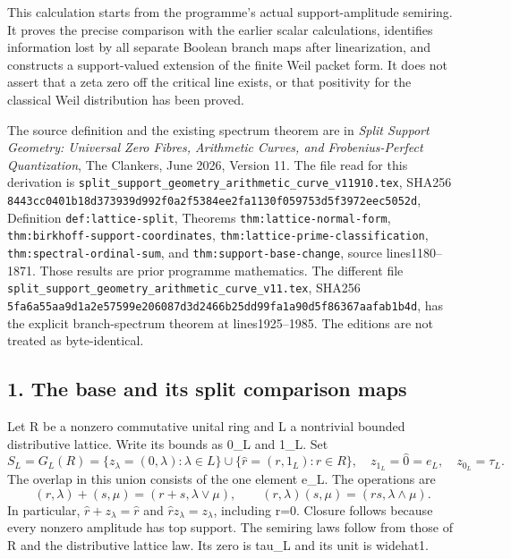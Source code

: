 \documentclass[
  10pt,
  a4paper,
]{article}
\begin{document}
This calculation starts from the programme's actual support-amplitude
semiring. It proves the precise comparison with the earlier scalar
calculations, identifies information lost by all separate Boolean branch
maps after linearization, and constructs a support-valued extension of
the finite Weil packet form. It does not assert that a zeta zero off the
critical line exists, or that positivity for the classical Weil
distribution has been proved.

The source definition and the existing spectrum theorem are in
\emph{Split Support Geometry: Universal Zero Fibres, Arithmetic Curves,
and Frobenius-Perfect Quantization}, The Clankers, June 2026, Version
11. The file read for this derivation is
\texttt{split\_\allowbreak{}support\_\allowbreak{}geometry\_\allowbreak{}arithmetic\_\allowbreak{}curve\_\allowbreak{}v11910.\allowbreak{}tex}, SHA256
\texttt{8443cc04\allowbreak{}01b18d37\allowbreak{}3939d992\allowbreak{}f0a2f538\allowbreak{}4ee2fa11\allowbreak{}30f05975\allowbreak{}3d5f3972\allowbreak{}eec5052d},
Definition \texttt{def:\allowbreak{}lattice-\allowbreak{}split}, Theorems
\texttt{thm:\allowbreak{}lattice-\allowbreak{}normal-\allowbreak{}form},
\texttt{thm:\allowbreak{}birkhoff-\allowbreak{}support-\allowbreak{}coordinates},
\texttt{thm:\allowbreak{}lattice-\allowbreak{}prime-\allowbreak{}classification},
\texttt{thm:\allowbreak{}spectral-\allowbreak{}ordinal-\allowbreak{}sum}, and \texttt{thm:\allowbreak{}support-\allowbreak{}base-\allowbreak{}change},
source lines1180--1871. Those results are prior programme mathematics.
The different file
\texttt{split\_\allowbreak{}support\_\allowbreak{}geometry\_\allowbreak{}arithmetic\_\allowbreak{}curve\_\allowbreak{}v11.\allowbreak{}tex}, SHA256
\texttt{5fa6a55a\allowbreak{}a9d1a2e5\allowbreak{}7599e206\allowbreak{}087d3d24\allowbreak{}66b25dd9\allowbreak{}9fa1a90d\allowbreak{}5f86367a\allowbreak{}afab1b4d},
has the explicit branch-spectrum theorem at lines1925--1985. The
editions are not treated as byte-identical.

\subsection{1. The base and its split comparison
maps}\label{the-base-and-its-split-comparison-maps}

Let R be a nonzero commutative unital ring and L a nontrivial bounded
distributive lattice. Write its bounds as 0\_L and 1\_L. Set \[
S_L=G_L(R)=\{z_\lambda=(0,\lambda):\lambda\in L\}
\cup\{\widehat r=(r,1_L):r\in R\},
\quad z_{1_L}=\widehat0=e_L,\quad z_{0_L}=\tau_L.
\tag{FSR1}
\] The overlap in this union consists of the one element e\_L. The
operations are \[
(r,\lambda)+(s,\mu)=(r+s,\lambda\vee\mu),\qquad
(r,\lambda)(s,\mu)=(rs,\lambda\wedge\mu).
\tag{FSR2}
\] In particular, \(\widehat r+z_\lambda=\widehat r\) and
\(\widehat r z_\lambda=z_\lambda\), including r=0. Closure follows
because every nonzero amplitude has top support. The semiring laws
follow from those of R and the distributive lattice law. Its zero is
tau\_L and its unit is widehat1.
\end{document}
